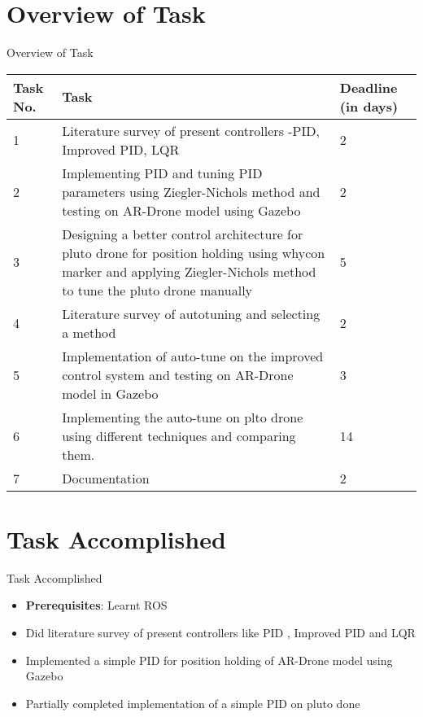 \documentclass[10pt, a4paper]{beamer}
\begin{document}
\section{Overview of Task}
\begin{frame}{Overview of Task}
	\begin{tabular}{|p{1.7em}|p{20em}|p{5em}|}\hline
		\textbf{Task No.} & \textbf{Task} & \textbf{Deadline (in days)}\\\hline
		1 & \small{Literature survey of present controllers -PID, Improved PID, LQR} & 2\\\hline
			2 &\small{Implementing PID and tuning PID parameters using Ziegler-Nichols method and testing on AR-Drone model using Gazebo}& 2\\\hline
3 &\small{ Designing a better control architecture for pluto drone for position holding using whycon marker and applying Ziegler-Nichols method to tune the pluto drone manually }& 5\\\hline
4 &\small{ Literature survey of autotuning and selecting a method }& 2\\\hline
	5 &\small{ Implementation of auto-tune on the improved control system and testing on AR-Drone model in Gazebo}& 3\\\hline
6 &\small{ Implementing the auto-tune on plto drone using different techniques and comparing them. }& 14\\\hline
	7 &\small{ Documentation }& 2\\\hline			 
		
	
	\end{tabular}
\end{frame}

\section{Task Accomplished}
\begin{frame}{Task Accomplished}
	\begin{itemize}
		\item \textbf{Prerequisites}: Learnt ROS \vspace{1em}
		
		\item Did literature survey of present controllers like PID , Improved PID and LQR \vspace{1em}
		
		\item Implemented a simple PID for position holding of AR-Drone model using Gazebo \vspace{1em}
		
		\item Partially completed implementation of a simple PID on pluto done
	\end{itemize}
\end{frame}
\end{document}
